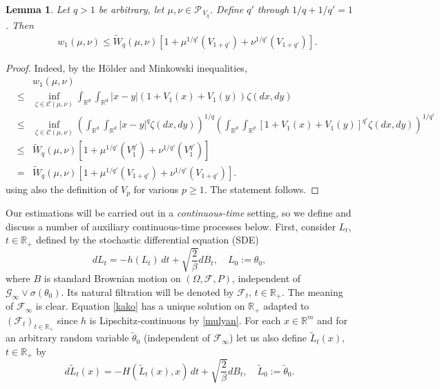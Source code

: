 \documentclass[a4paper,draft]{article}
\newtheorem{lemma}[theorem]{Lemma}
\begin{document}
\begin{lemma}\label{mr} Let $q>1$ be arbitrary, let
$\mu,\nu\in\mathcal{P}_{\, V_q}$. Define $q'$ through $1/q+1/q'=1$.
Then
\begin{eqnarray*}
& & w_1(\mu,\nu)
\leq \tilde{W}_{q}(\mu,\nu)[1+\mu^{1/q'}(V_{1+q'})+\nu^{1/q'}(V_{1+q'})].
\end{eqnarray*}
\end{lemma}
\begin{proof}
Indeed, by the H\"older and Minkowski inequalities,
\begin{eqnarray*}
& & w_1(\mu,\nu)\\
&\leq & \inf_{\zeta\in\mathcal{C}(\mu,\nu)}\int_{\mathbb{R}^d}\int_{\mathbb{R}^d}
|x-y|(1+V_1(x)+V_1(y))\zeta(dx,dy)\\
&\leq & \inf_{\zeta\in\mathcal{C}(\mu,\nu)}\left(\int_{\mathbb{R}^d}\int_{\mathbb{R}^d} |x-y|^{q}\zeta(dx,dy)\right)^{1/q}
\left(\int_{\mathbb{R}^d}\int_{\mathbb{R}^d} [1+V_1(x)+V_1(y)]^{q'}\zeta(dx,dy)\right)^{1/q'}\\
&\leq& \tilde{W}_{q}(\mu,\nu)[1+\mu^{1/q'}(V^{q'}_{1})+\nu^{1/q'}(V^{q'}_{1})]\\
&=& \tilde{W}_{q}(\mu,\nu)[1+\mu^{1/q'}(V_{1+q'})+\nu^{1/q'}(V_{1+q'})].
\end{eqnarray*}
using also the definition of $V_p$ for various $p\geq 1$. The statement follows.
\end{proof}



Our estimations will be carried out in a \emph{continuous-time} setting, so
we define and discuss a number of auxiliary {continuous-time} processes below.
First, consider $L_t$, $t\in\mathbb{R}_+$ defined by
the stochastic differential equation (SDE)
\begin{equation}\label{kako}
dL_t=-h(L_t)\, dt+ \sqrt{\frac{2}{\beta}} dB_t,\quad L_0:=\theta_0,
\end{equation}
where $B$ is standard Brownian motion on $(\Omega,\mathcal{F},P)$,
independent of $\mathcal{G}_{\infty}\vee \sigma(\theta_0)$. Its natural filtration
will be denoted by $\mathcal{F}_t$, $t\in\mathbb{R}_+$. The meaning of $\mathcal{F}_{\infty}$
is clear. Equation \eqref{kako}
has a unique solution on $\mathbb{R}_+$ adapted to $(\mathcal{F}_t)_{t\in\mathbb{R}_+}$ since $h$ is
Lipschitz-continuous by \eqref{mulyan}. For each $x\in\mathbb{R}^m$ and for
an arbitrary random variable $\tilde{\theta}_0$ (independent of $\mathcal{F}_{\infty}$)
let us also define $\tilde{L}_t(x)$, $t\in\mathbb{R}_+$ by
\begin{equation*}
d\tilde{L}_t(x)=-H(\tilde{L}_t(x),x)\, dt+ \sqrt{\frac{2}{\beta}} dB_t,\quad \tilde{L}_0:=\tilde{\theta}_0.
\end{equation*}
\end{document}
